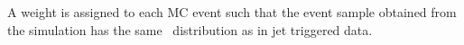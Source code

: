 %
A weight is assigned to each MC event such that the event sample obtained from the simulation has the same \ETfcal\ distribution as in jet triggered data.


